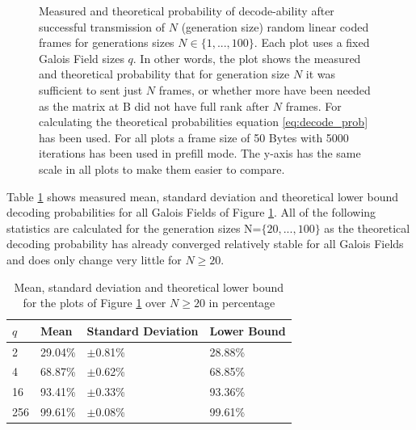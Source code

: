 \documentclass[a4paper,english,10pt]{tumarticle}
\begin{document}
\begin{figure}[htb]
  \hfill
  \caption{Measured and theoretical probability of decode-ability after successful transmission
  of $N$ (generation size) random linear coded frames for generations sizes $N\in\{1, ..., 100\}$. Each plot uses a fixed Galois
  Field sizes $q$. In other words, the plot shows the measured and theoretical
  probability that for generation size $N$ it was sufficient to sent just $N$ frames,
  or whether more have been needed as the matrix at B did not have full rank after $N$ frames. For calculating the theoretical probabilities equation \eqref{eq:decode_prob} has been used.
  For all plots a frame size of 50 Bytes with 5000 iterations has been used in
  prefill mode. The y-axis has the same scale in all plots to make them easier to
  compare.
  }\label{fig:gfs}
\end{figure}

Table \ref{tab:mean-std} shows measured mean, standard deviation and theoretical
lower bound decoding probabilities for all Galois Fields of Figure \ref{fig:gfs}.
All of the following statistics are calculated for the generation sizes N=$\{20,
..., 100\}$ as the theoretical decoding probability has already converged relatively stable for all
Galois Fields and does only change very little for $N\ge20$. 



\begin{table}[htb]
  \caption{Mean, standard deviation and theoretical lower bound for the plots of Figure \ref{fig:gfs} over $N\ge20$ in percentage}
  \label{tab:mean-std}
  \centering
  \begin{tabular}{l|l|l|l}
    \toprule
       $q$ & Mean & Standard Deviation & Lower Bound \\
    \midrule
    2 & 29.04\% & $\pm$0.81\% & 28.88\%\\
    4 & 68.87\% & $\pm$0.62\% & 68.85\%\\
    16 & 93.41\% & $\pm$0.33\% & 93.36\%\\
    256 & 99.61\% & $\pm$0.08\% & 99.61\%\\
    \bottomrule
  \end{tabular}
\end{table}
\end{document}
